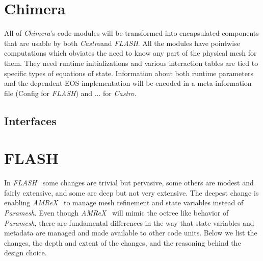 \documentclass{article}
\newcommand{\flash}{{\it FLASH}}
\newcommand{\amrex}{{\it AMReX}}
\newcommand{\paramesh}{{\it Paramesh}}
\newcommand{\castro}{{\it Castro}}
\newcommand{\chimera}{{\it Chimera}}
\begin{document}
\section{Chimera}
All of \chimera's code modules will be transformed into encapsulated
components that are usable by both \castro and \flash. All the modules
have pointwise computations which obviates the need to know any part of
the physical mesh for them. They need runtime initializations and
various interaction tables are tied to specific types of equations of
state. Information about both runtime parameters and the dependent EOS
implementation will be encoded in a meta-information file (Config for
\flash) and ... for \castro.
\subsection{Interfaces}
\label{sec:chimera-interfaces}
\begin{itemize}
\end{itemize}

\section{FLASH}
\label{sec:flash}
 In \flash~ some changes are trivial but pervasive, some others are
modest and fairly extensive, and some are deep but not very
extensive. The deepest change is enabling \amrex~ to manage mesh
refinement and state variables instead of \paramesh. Even though
\amrex~ will mimic the octree like behavior of \paramesh, there are
fundamental differences in the way that state variables and metadata
are managed and made available to other code units. Below we list the
changes, the depth and extent of the changes, and the reasoning behind
the design choice.
\end{document}
